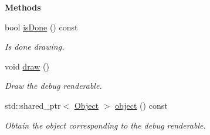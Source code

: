 \begin{Indent}\textbf{ Methods}\par
\begin{DoxyCompactItemize}
\item 
\mbox{\label{structrev_1_1_debug_manager_1_1_debug_renderable_a8e47ef2ef136a936126c028c6f1d5a84}} 
bool \mbox{\hyperlink{structrev_1_1_debug_manager_1_1_debug_renderable_a8e47ef2ef136a936126c028c6f1d5a84}{is\+Done}} () const
\begin{DoxyCompactList}\small\item\em Is done drawing. \end{DoxyCompactList}\item 
\mbox{\label{structrev_1_1_debug_manager_1_1_debug_renderable_a395e4e34b8035c71fd650cbdaa7edc34}} 
void \mbox{\hyperlink{structrev_1_1_debug_manager_1_1_debug_renderable_a395e4e34b8035c71fd650cbdaa7edc34}{draw}} ()
\begin{DoxyCompactList}\small\item\em Draw the debug renderable. \end{DoxyCompactList}\item 
\mbox{\label{structrev_1_1_debug_manager_1_1_debug_renderable_a4283f2324810d7683b4b615b54430fd1}} 
std\+::shared\+\_\+ptr$<$ \mbox{\hyperlink{classrev_1_1_object}{Object}} $>$ \mbox{\hyperlink{structrev_1_1_debug_manager_1_1_debug_renderable_a4283f2324810d7683b4b615b54430fd1}{object}} () const
\begin{DoxyCompactList}\small\item\em Obtain the object corresponding to the debug renderable. \end{DoxyCompactList}\end{DoxyCompactItemize}
\end{Indent}
